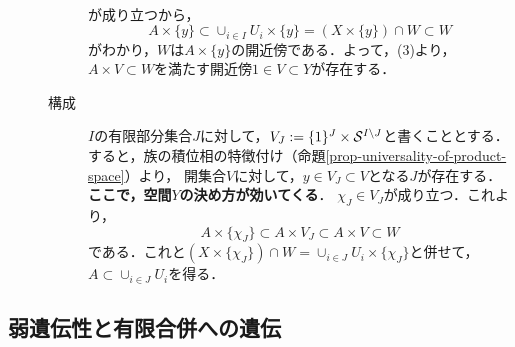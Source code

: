 \documentclass[uplatex,dvipdfmx]{jsreport}
\begin{document}
\begin{Proof}
\begin{description}
\begin{description}
\begin{align*}
            \end{align*}
            が成り立つから，
            \[A\times\{y\}\subset\cup_{i\in I}U_i\times\{y\}=(X\times\{y\})\cap W\subset W\]
            がわかり，$W$は$A\times\{y\}$の開近傍である．よって，(3)より，$A\times V\subset W$を満たす開近傍$1\in V\subset Y$が存在する．
            \item[構成]
            $I$の有限部分集合$J$に対して，$V_J:=\{1\}^J\times\S^{I\setminus J}$と書くこととする．
            すると，族の積位相の特徴付け（命題\ref{prop-universality-of-product-space}）より，
            開集合$V$に対して，$y\in V_J\subset V$となる$J$が存在する．
            \textbf{ここで，空間$Y$の決め方が効いてくる}．
            $\chi_J\in V_J$が成り立つ．これより，
            \[A\times\{\chi_J\}\subset A\times V_J\subset A\times V\subset W\]
            である．これと$(X\times\{\chi_J\})\cap W=\cup_{i\in J}U_i\times\{\chi_J\}$と併せて，$A\subset\cup_{i\in J}U_i$を得る．
        \end{description}
    \end{description}
\end{Proof}

\subsection{弱遺伝性と有限合併への遺伝}
\end{document}
